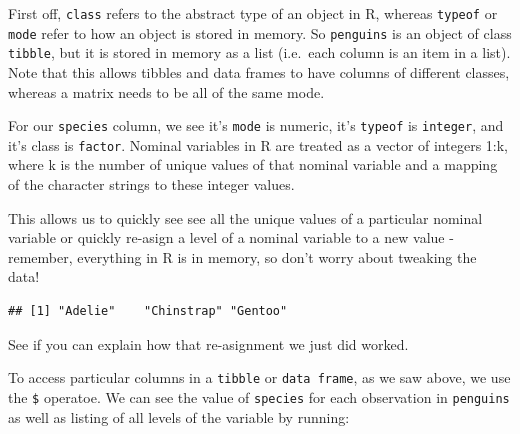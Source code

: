 \documentclass[
]{book}
\newenvironment{Shaded}{\begin{snugshade}}{\end{snugshade}}
\newcommand{\DecValTok}[1]{\textcolor[rgb]{0.00,0.00,0.81}{#1}}
\newcommand{\KeywordTok}[1]{\textcolor[rgb]{0.13,0.29,0.53}{\textbf{#1}}}
\newcommand{\NormalTok}[1]{#1}
\newcommand{\OperatorTok}[1]{\textcolor[rgb]{0.81,0.36,0.00}{\textbf{#1}}}
\newcommand{\StringTok}[1]{\textcolor[rgb]{0.31,0.60,0.02}{#1}}
\begin{document}
First off, \texttt{class} refers to the abstract type of an object in R, whereas \texttt{typeof} or \texttt{mode} refer to how an object is stored in memory. So \texttt{penguins} is an object of class \texttt{tibble}, but it is stored in memory as a list (i.e.~each column is an item in a list). Note that this allows tibbles and data frames to have columns of different classes, whereas a matrix needs to be all of the same mode.

For our \texttt{species} column, we see it's \texttt{mode} is numeric, it's \texttt{typeof} is \texttt{integer}, and it's class is \texttt{factor}. Nominal variables in R are treated as a vector of integers 1:k, where k is the number of unique values of that nominal variable and a mapping of the character strings to these integer values.

This allows us to quickly see see all the unique values of a particular nominal variable or quickly re-asign a level of a nominal variable to a new value - remember, everything in R is in memory, so don't worry about tweaking the data!

\begin{Shaded}
\end{Shaded}

\begin{verbatim}
## [1] "Adelie"    "Chinstrap" "Gentoo"
\end{verbatim}

\begin{Shaded}
\end{Shaded}

See if you can explain how that re-asignment we just did worked.

To access particular columns in a \texttt{tibble} or \texttt{data\ frame}, as we saw above, we use the \texttt{\$} operatoe. We can see the value of \texttt{species} for each observation in \texttt{penguins} as well as listing of all levels of the variable by running:

\begin{Shaded}
\end{Shaded}
\end{document}

